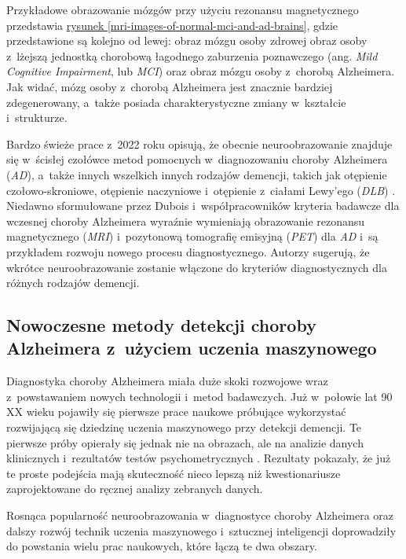 {Przykładowe obrazowanie mózgów przy użyciu rezonansu magnetycznego przedstawia \hyperref[mri-images-of-normal-mci-and-ad-brains]{rysunek \ref*{mri-images-of-normal-mci-and-ad-brains}}, gdzie przedstawione są kolejno od lewej: obraz mózgu osoby zdrowej obraz osoby z~lżejszą jednostką chorobową łagodnego zaburzenia poznawczego (ang. \emph{Mild Cognitive Impairment}, lub \emph{MCI}) oraz obraz mózgu osoby z~chorobą Alzheimera.
Jak widać, mózg osoby z~chorobą Alzheimera jest znacznie bardziej zdegenerowany, a~także posiada charakterystyczne zmiany w~kształcie i~strukturze.

Bardzo świeże prace z~2022 roku opisują, że obecnie neuroobrazowanie znajduje się w~ścisłej czołówce metod pomocnych w~diagnozowaniu choroby Alzheimera (\emph{AD}), a~także innych wszelkich innych rodzajów demencji, takich jak otępienie czołowo-skroniowe, otępienie naczyniowe i~otępienie z~ciałami Lewy'ego (\emph{DLB}) \cite{scheltens2022imaging}.
Niedawno sformułowane przez Dubois i~współpracowników kryteria badawcze dla wczesnej choroby Alzheimera wyraźnie wymieniają obrazowanie rezonansu magnetycznego (\emph{MRI}) i~pozytonową tomografię emisyjną (\emph{PET}) dla \emph{AD} i~są przykładem rozwoju nowego procesu diagnostycznego.
Autorzy sugerują, że wkrótce neuroobrazowanie zostanie włączone do kryteriów diagnostycznych dla różnych rodzajów demencji.

\subsection{Nowoczesne metody detekcji choroby Alzheimera z~użyciem uczenia maszynowego}
\label{modern-detection-methods-for-alzheimers-using-machine-learning}

Diagnostyka choroby Alzheimera miała duże skoki rozwojowe wraz z~powstawaniem nowych technologii i~metod badawczych.
Już w~połowie lat 90 XX wieku pojawiły się pierwsze prace naukowe próbujące wykorzystać rozwijającą się dziedzinę uczenia maszynowego przy detekcji demencji.
Te pierwsze próby opierały się jednak nie na obrazach, ale na analizie danych klinicznych i~rezultatów testów psychometrycznych \cite{datta1996applying}.
Rezultaty pokazały, że już te proste podejścia mają skuteczność nieco lepszą niż kwestionariusze zaprojektowane do ręcznej analizy zebranych danych.

Rosnąca popularność neuroobrazowania w~diagnostyce choroby Alzheimera oraz dalszy rozwój technik uczenia maszynowego i~sztucznej inteligencji doprowadziły do powstania wielu prac naukowych, które łączą te dwa obszary.

}
